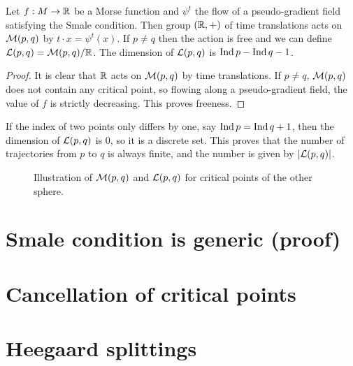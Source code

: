 \begin{prop}
    Let $f: M \to  \mathbb{R}$ be a Morse function and $\psi^{t}$ the flow of a pseudo-gradient field satisfying the Smale condition.
    Then group $(\mathbb{R}, +)$ of time translations acts on $\mathcal M(p, q)$ by  $t \cdot x = \psi^{t}(x)$.  If $p \neq q$ then the action is free and we can define $ \mathcal L(p, q) = \mathcal M(p, q) / \mathbb{R} $. The dimension of $\mathcal L(p, q)$ is $\operatorname{Ind} p - \operatorname{Ind} q - 1$.
\end{prop}
\begin{proof}
    It is clear that $\mathbb{R}$ acts on $\mathcal M(p, q)$ by time translations. 
    If $p \neq q$,  $\mathcal M(p, q)$ does not contain any critical point, so flowing along a pseudo-gradient field, the value of $f$ is strictly decreasing. This proves freeness.
\end{proof}

\begin{remark}
    If the index of two points only differs by one, say $\operatorname{Ind} p = \operatorname{Ind} q + 1$, then the dimension of $\mathcal L(p, q)$ is $0$, so it is a discrete set.
    This proves that the number of trajectories from $p$ to $q$ is always finite, and the number is given by $| \mathcal L(p, q)|$.
\end{remark}





\begin{figure}[H]
    \centering
    \caption{
        Illustration of $\mathcal M(p, q)$ and $\mathcal L(p, q)$ for critical points of the other sphere.
    }
    \label{fig:mathcal-m-trajectories-other-sphere}
\end{figure}





\section{Smale condition is generic (proof)}
\section{Cancellation of critical points}


\section{Heegaard splittings}

